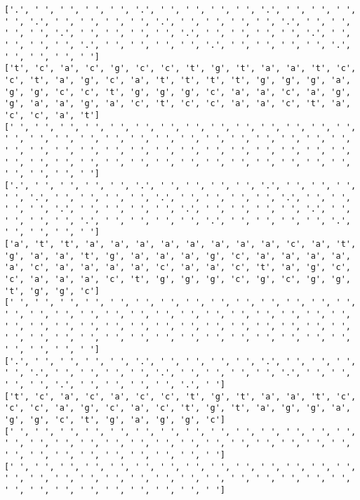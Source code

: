 \documentclass{article}
\begin{document}
\begin{Verbatim}
['.', ' ', ' ', ' ', ' ', '.', ' ', ' ', ' ', ' ', '.', ' ', ' ', ' ', ' ', '.', ' ', ' ', ' ', ' ', '.', ' ', ' ', ' ', ' ', '.', ' ', ' ', ' ', ' ', '.', ' ', ' ', ' ', ' ', '.', ' ', ' ', ' ', ' ', '.', ' ', ' ', ' ', ' ', '.', ' ', ' ', ' ', ' ', '.', ' ', ' ', ' ', ' ', '.', ' ', ' ', ' ', ' ']
['t', 'c', 'a', 'c', 'g', 'c', 'c', 't', 'g', 't', 'a', 'a', 't', 'c', 'c', 't', 'a', 'g', 'c', 'a', 't', 't', 't', 't', 'g', 'g', 'g', 'a', 'g', 'g', 'c', 'c', 't', 'g', 'g', 'g', 'c', 'a', 'a', 'c', 'a', 'g', 'g', 'a', 'a', 'g', 'a', 'c', 't', 'c', 'c', 'a', 'a', 'c', 't', 'a', 'c', 'c', 'a', 't']
[' ', ' ', ' ', ' ', ' ', ' ', ' ', ' ', ' ', ' ', ' ', ' ', ' ', ' ', ' ', ' ', ' ', ' ', ' ', ' ', ' ', ' ', ' ', ' ', ' ', ' ', ' ', ' ', ' ', ' ', ' ', ' ', ' ', ' ', ' ', ' ', ' ', ' ', ' ', ' ', ' ', ' ', ' ', ' ', ' ', ' ', ' ', ' ', ' ', ' ', ' ', ' ', ' ', ' ', ' ', ' ', ' ', ' ', ' ', ' ']
['.', ' ', ' ', ' ', ' ', '.', ' ', ' ', ' ', ' ', '.', ' ', ' ', ' ', ' ', '.', ' ', ' ', ' ', ' ', '.', ' ', ' ', ' ', ' ', '.', ' ', ' ', ' ', ' ', '.', ' ', ' ', ' ', ' ', '.', ' ', ' ', ' ', ' ', '.', ' ', ' ', ' ', ' ', '.', ' ', ' ', ' ', ' ', '.', ' ', ' ', ' ', ' ', '.', ' ', ' ', ' ', ' ']
['a', 't', 't', 'a', 'a', 'a', 'a', 'a', 'a', 'a', 'a', 'c', 'a', 't', 'g', 'a', 'a', 't', 'g', 'a', 'a', 'a', 'g', 'c', 'a', 'a', 'a', 'a', 'a', 'c', 'a', 'a', 'a', 'a', 'c', 'a', 'a', 'c', 't', 'a', 'g', 'c', 'c', 'a', 'a', 'a', 'c', 't', 'g', 'g', 'g', 'c', 'g', 'c', 'g', 'g', 't', 'g', 'g', 'c']
[' ', ' ', ' ', ' ', ' ', ' ', ' ', ' ', ' ', ' ', ' ', ' ', ' ', ' ', ' ', ' ', ' ', ' ', ' ', ' ', ' ', ' ', ' ', ' ', ' ', ' ', ' ', ' ', ' ', ' ', ' ', ' ', ' ', ' ', ' ', ' ', ' ', ' ', ' ', ' ', ' ', ' ', ' ', ' ', ' ', ' ', ' ', ' ', ' ', ' ', ' ', ' ', ' ', ' ', ' ', ' ', ' ', ' ', ' ', ' ']
['.', ' ', ' ', ' ', ' ', '.', ' ', ' ', ' ', ' ', '.', ' ', ' ', ' ', ' ', '.', ' ', ' ', ' ', ' ', '.', ' ', ' ', ' ', ' ', '.', ' ', ' ', ' ', ' ', '.', ' ', ' ', ' ', ' ', '.', ' ']
['t', 'c', 'a', 'c', 'a', 'c', 'c', 't', 'g', 't', 'a', 'a', 't', 'c', 'c', 'c', 'a', 'g', 'c', 'a', 'c', 't', 'g', 't', 'a', 'g', 'g', 'a', 'g', 'g', 'c', 't', 'g', 'a', 'g', 'g', 'c']
[' ', ' ', ' ', ' ', ' ', ' ', ' ', ' ', ' ', ' ', ' ', ' ', ' ', ' ', ' ', ' ', ' ', ' ', ' ', ' ', ' ', ' ', ' ', ' ', ' ', ' ', ' ', ' ', ' ', ' ', ' ', ' ', ' ', ' ', ' ', ' ', ' ']
[' ', ' ', ' ', ' ', ' ', ' ', ' ', ' ', ' ', ' ', ' ', ' ', ' ', ' ', ' ', ' ', ' ', ' ', ' ', ' ', ' ', ' ', ' ', ' ', ' ', ' ', ' ', ' ', ' ', ' ', ' ', ' ', ' ', ' ', ' ', ' ', ' ']
\end{Verbatim}
\end{document}
